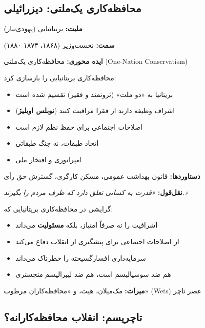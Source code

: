 \subsection{محافظه‌کاری یک‌ملتی: دیزرائیلی}

\begin{personbox}

\textbf{ملیت:} بریتانیایی (یهودی‌تبار)

\textbf{سمت:} نخست‌وزیر (۱۸۶۸، ۱۸۷۴-۱۸۸۰)

\textbf{ایده محوری:} محافظه‌کاری یک‌ملتی (One-Nation Conservatism)

\mediumspace

 محافظه‌کاری بریتانیایی را بازسازی کرد:

\begin{itemize}[nosep]
    \item بریتانیا به «دو ملت» (ثروتمند و فقیر) تقسیم شده است
    \item اشراف وظیفه دارند از فقرا مراقبت کنند (\textbf{نوبلس اوبلیژ})
    \item اصلاحات اجتماعی برای حفظ نظم لازم است
    \item اتحاد طبقات، نه جنگ طبقاتی
    \item امپراتوری و افتخار ملی
\end{itemize}

\mediumspace

\textbf{دستاوردها:} قانون بهداشت عمومی، مسکن کارگری، گسترش حق رأی

\textbf{نقل‌قول:} \textit{«قدرت به کسانی تعلق دارد که طرف مردم را بگیرند.»}
\end{personbox}

\begin{defbox}
گرایشی در محافظه‌کاری بریتانیایی که:
\begin{itemize}[nosep]
    \item اشرافیت را نه صرفاً امتیاز، بلکه \textbf{مسئولیت} می‌داند
    \item از اصلاحات اجتماعی برای پیشگیری از انقلاب دفاع می‌کند
    \item سرمایه‌داری افسارگسیخته را خطرناک می‌داند
    \item هم ضد سوسیالیسم است، هم ضد لیبرالیسم منچستری
\end{itemize}
\textbf{میراث:} مک‌میلان، هیث، و «محافظه‌کاران مرطوب» (Wets) عصر تاچر
\end{defbox}

\subsection{تاچریسم: انقلاب محافظه‌کارانه؟}

